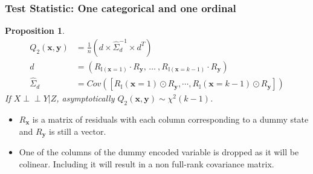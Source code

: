 \documentclass{beamer}
\def\ci{\perp\!\!\!\!\!\perp}
\newtheorem{proposition}{Proposition}
\begin{document}
\begin{frame}
	\frametitle{Test Statistic: One categorical and one ordinal}
	\begin{proposition}

	\begin{equation*}
		\begin{split}
		Q_2(\bm{x}, \bm{y}) &= \frac{1}{n} (d \times \hat{\Sigma}_d^{-1} \times d^T) \\
		d &= (R_{\mathbb{I}(\mathbf{x}=1)} \cdot R_{\mathbf{y}}, \, \ldots \ , R_{\mathbb{I}(\mathbf{x}=k-1)} \cdot R_{\mathbf{y}}) \\ 
		\hat{\Sigma}_d &= Cov([R_\mathbb{I}(\mathbf{x}=1) \odot R_\mathbf{y}, \cdots, R_\mathbb{I}(\mathbf{x}=k-1) \odot R_\mathbf{y}])
		\end{split}
	\end{equation*}
		If $ X \ci Y | Z $, asymptotically $ Q_2(\bm{x}, \bm{y}) \sim \chi^2(k-1) $.
	\end{proposition}
	\begin{center}
		\begin{itemize}
			\item $ R_{\bm{x}} $ is a matrix of residuals with each column corresponding to a dummy state and $ R_{\bm{y}} $ is still a vector.
			\item One of the columns of the dummy encoded variable
				is dropped as it will be colinear. Including it will
				result in a non full-rank covariance matrix.
		\end{itemize}
	\end{center}
\end{frame}
\end{document}
